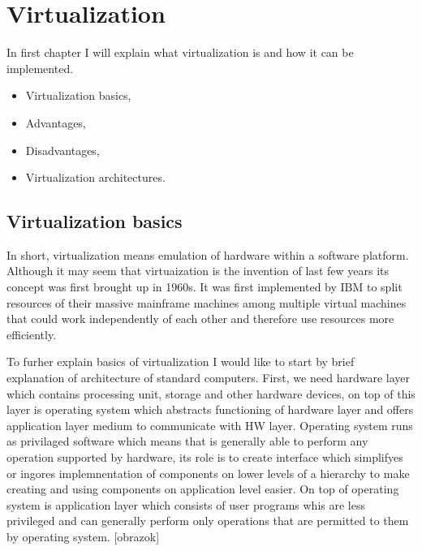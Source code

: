 
\chapter{Virtualization}
In first chapter I will explain what virtualization is and how it can be implemented.
\begin{itemize}
\item Virtualization basics,
\item Advantages,
\item Disadvantages,
\item Virtualization architectures.
\end{itemize}

\section{Virtualization basics}
In short, virtualization means emulation of hardware within a software platform. Although it may seem that virtuaization is the invention of last few years its concept was first brought up in 1960s. It was first implemented by IBM to split resources of their massive mainframe machines among multiple virtual machines that could work independently of each other and therefore use resources more efficiently.

To furher explain basics of virtualization I would like to start by brief explanation of architecture of standard computers. First, we need hardware layer which contains processing unit, storage and other hardware devices, on top of this layer is operating system which abstracts functioning of hardware layer and offers application layer medium to communicate with HW layer. Operating system runs as privilaged software which means that is generally able to perform any operation supported by hardware, its role is to create interface which simplifyes or ingores implemnentation of components on lower levels of a hierarchy to make creating and using components on application level easier. On top of operating system is application layer which consists of user programs whis are less privileged and can generally perform only operations that are permitted to them by operating system. [obrazok]

